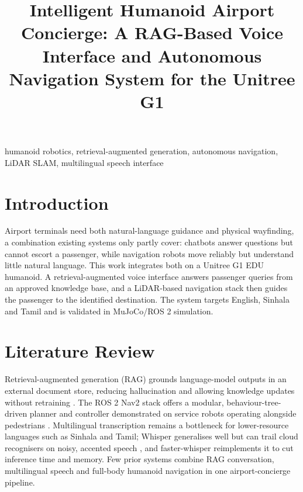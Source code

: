 \documentclass[conference]{IEEEtran}
\begin{document}
\title{Intelligent Humanoid Airport Concierge: A RAG-Based Voice Interface and Autonomous Navigation System for the Unitree G1}

\author{
\and
{}
}

\maketitle

\begin{IEEEkeywords}
humanoid robotics, retrieval-augmented generation, autonomous navigation, LiDAR SLAM, multilingual speech interface
\end{IEEEkeywords}

\section{Introduction}
Airport terminals need both natural-language guidance and physical wayfinding, a combination existing systems only partly cover: chatbots answer questions but cannot escort a passenger, while navigation robots move reliably but understand little natural language. This work integrates both on a Unitree G1 EDU humanoid. A retrieval-augmented voice interface answers passenger queries from an approved knowledge base, and a LiDAR-based navigation stack then guides the passenger to the identified destination. The system targets English, Sinhala and Tamil and is validated in MuJoCo/ROS 2 simulation.

\section{Literature Review}
Retrieval-augmented generation (RAG) grounds language-model outputs in an external document store, reducing hallucination and allowing knowledge updates without retraining \cite{lewis2020rag}. The ROS 2 Nav2 stack offers a modular, behaviour-tree-driven planner and controller demonstrated on service robots operating alongside pedestrians \cite{macenski2020marathon2}. Multilingual transcription remains a bottleneck for lower-resource languages such as Sinhala and Tamil; Whisper generalises well but can trail cloud recognisers on noisy, accented speech \cite{radford2022whisper}, and faster-whisper \cite{systran_fasterwhisper} reimplements it to cut inference time and memory. Few prior systems combine RAG conversation, multilingual speech and full-body humanoid navigation in one airport-concierge pipeline.
\end{document}
